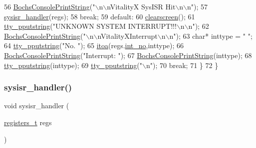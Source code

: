 \begin{DoxyCode}
56             \hyperlink{a00056_a19e1f554d03c977f8b947f21489daa41_a19e1f554d03c977f8b947f21489daa41}{BochsConsolePrintString}(\textcolor{stringliteral}{"\(\backslash\)n\(\backslash\)nVitalityX SysISR Hit\(\backslash\)n\(\backslash\)n"});
57             \hyperlink{a00092_abd1fa375737cd5ecd84c082738e3b195_abd1fa375737cd5ecd84c082738e3b195}{sysisr\_handler}(regs);
58             \textcolor{keywordflow}{break};
59         \textcolor{keywordflow}{default}:
60             \hyperlink{a00140_aff4bc17c602603d120756f52e18ebb96_aff4bc17c602603d120756f52e18ebb96}{clearscreen}();
61             \hyperlink{a00140_ade960b1320324706aac6c00cc6b1b2fe_ade960b1320324706aac6c00cc6b1b2fe}{tty\_pputstring}(\textcolor{stringliteral}{"UNKNOWN SYSTEM INTERRUPT!!!\(\backslash\)n\(\backslash\)n"});
62             \hyperlink{a00056_a19e1f554d03c977f8b947f21489daa41_a19e1f554d03c977f8b947f21489daa41}{BochsConsolePrintString}(\textcolor{stringliteral}{"\(\backslash\)n\(\backslash\)nVitalityXInterrupt\(\backslash\)n\(\backslash\)n"});
63             \textcolor{keywordtype}{char}* inttype = \textcolor{stringliteral}{"  "};
64             \hyperlink{a00140_ade960b1320324706aac6c00cc6b1b2fe_ade960b1320324706aac6c00cc6b1b2fe}{tty\_pputstring}(\textcolor{stringliteral}{"No. "});
65             \hyperlink{a00104_af749add1ff19b6ff96a62f35ebb49b7e_af749add1ff19b6ff96a62f35ebb49b7e}{itoa}(regs.\hyperlink{a00202_af311750a9b18afb3b1ed2d144fbe1cb0_af311750a9b18afb3b1ed2d144fbe1cb0}{int\_no},inttype);
66             \hyperlink{a00056_a19e1f554d03c977f8b947f21489daa41_a19e1f554d03c977f8b947f21489daa41}{BochsConsolePrintString}(\textcolor{stringliteral}{"Interrupt: "});
67             \hyperlink{a00056_a19e1f554d03c977f8b947f21489daa41_a19e1f554d03c977f8b947f21489daa41}{BochsConsolePrintString}(inttype);
68             \hyperlink{a00140_ade960b1320324706aac6c00cc6b1b2fe_ade960b1320324706aac6c00cc6b1b2fe}{tty\_pputstring}(inttype);
69             \hyperlink{a00140_ade960b1320324706aac6c00cc6b1b2fe_ade960b1320324706aac6c00cc6b1b2fe}{tty\_pputstring}(\textcolor{stringliteral}{"\(\backslash\)n"});
70             \textcolor{keywordflow}{break};
71     \}
72 \}
\end{DoxyCode}
\mbox{\label{a00092_abd1fa375737cd5ecd84c082738e3b195_abd1fa375737cd5ecd84c082738e3b195}} 
\subsubsection{\texorpdfstring{sysisr\+\_\+handler()}{sysisr\_handler()}}
{\footnotesize\ttfamily void sysisr\+\_\+handler (\begin{DoxyParamCaption}\item[{\hyperlink{a00095_adf58dbaf6139b4957c348711f2026957_adf58dbaf6139b4957c348711f2026957}{registers\+\_\+t}}]{regs }\end{DoxyParamCaption})}



